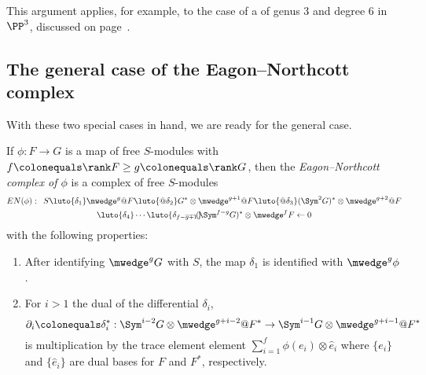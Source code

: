 This argument applies, for example,
to the case of a 
%
of genus 3 and
degree 6 in $\PP^{3}$, discussed on page~\pageref{other genus 3}.

\subsection*{The general case of the Eagon--Northcott complex}

With these two special cases in hand, we are ready for the general
case. 

\begin{definition}
If $\phi: F\to G$ is a map of free $S$-modules with 
$f\colonequals \rank F\geq  g\colonequals  \rank G$, then the
\emph{Eagon--Northcott complex of $\phi$}
%
is a complex of free $S$-modules
\begin{multline*}
EN(\phi): \quad
S \luto{\delta_1}
\mwedge^g @F
\luto{@\delta_{2}}
G^*\otimes \mwedge^{g+1}@ F  \luto{@\delta_{3}}
(\Sym^2G)^*\otimes\mwedge^{g+2}@F  \\
\luto{\delta_{4}}\cdots\luto{\delta_{f-g+1}}\hskip-23pt-\hskip-4pt-
(\Sym^{f-g}G)^*\otimes\mwedge^fF
\leftarrow 0
\end{multline*}
with the following properties:
\begin{enumerate}

\item After identifying $\mwedge^{g}G$ with $S$, the map $\delta_{1}$
is identified with $\mwedge^{g}\phi$.

\item For $i>1$ the dual of the differential $\delta_{i}$,
$$
\partial_{i} \colonequals \delta_{i}^{*}: \Sym^{i-2}G \otimes \mwedge^{g+i-2}@F^{*} \to
\Sym^{i-1}G \otimes \mwedge^{g+i-1}@F^{*}
$$ 
is multiplication by the trace element element
%
$\sum_{i = 1}^{f} \phi(e_{i}) \otimes \hat e_{i}$
where
$\{e_{i}\}$ and $\{\hat e_{i}\}$ are dual bases for $F$ and $F^{*}$, respectively.

\end{enumerate}
\end{definition}

